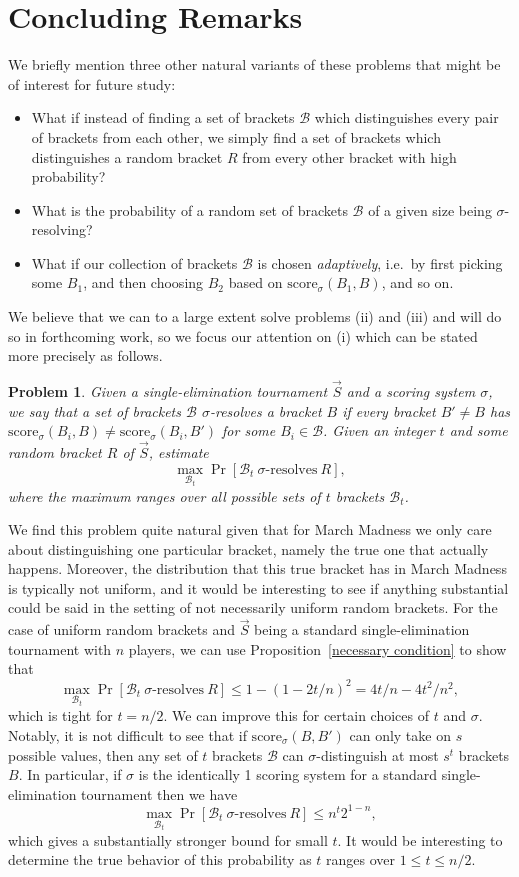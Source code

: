 \documentclass[12pt,letterpaper]{article}
\newtheorem{prob}[thm]{Problem}
\theoremstyle{definition}
\newcommand{\sig}{\sigma}
\renewcommand{\1}{\mathbbm{1}}
\renewcommand{\c}[1]{\mathcal{#1}}
\newcommand{\score}{\mathrm{score}}
\newcommand{\tour}{\vec{S}}
\begin{document}
\section{Concluding Remarks}\label{sec:concluding}

We briefly mention three other natural variants of these problems that might be of interest for future study:
\begin{itemize}
	\item[(i)] What if instead of finding a set of brackets $\c{B}$ which distinguishes every pair of brackets from each other, we simply find a set of brackets which distinguishes a random bracket $R$ from every other bracket with high probability?
	\item[(ii)] What is the probability of a random set of brackets $\c{B}$ of a given size being $\sig$-resolving?
	\item[(iii)] What if our collection of brackets $\c{B}$ is chosen \textit{adaptively}, i.e.\ by first picking some $B_1$, and then choosing $B_2$ based on $\score_\sig(B_1,B)$, and so on.
\end{itemize}

We believe that we can to a large extent solve problems (ii) and (iii) and will do so in forthcoming work, so we focus our attention on (i) which can be stated more precisely as follows.

\begin{prob}
	Given a single-elimination tournament $\tour$ and a scoring system $\sig$, we say that a set of brackets $\c{B}$ $\sig$-resolves a bracket $B$ if every bracket $B'\ne B$ has $\score_\sig(B_i,B)\ne \score_\sig(B_i,B')$ for some $B_i\in \c{B}$.  Given an integer $t$ and some random bracket $R$ of $\tour$, estimate
	\[\max_{\c{B}_t} \Pr[\c{B}_t\ \sig\textrm{-resolves}\ R],\]
	where the maximum ranges over all possible sets of $t$ brackets $\c{B}_t$.
\end{prob}
We find this problem quite natural given that for March Madness we only care about distinguishing one particular bracket, namely the true one that actually happens.  Moreover, the distribution that this true bracket has in March Madness is typically not uniform, and it would be interesting to see if anything substantial could be said in the setting of not necessarily uniform random brackets.  For the case of uniform random brackets and $\tour$ being a standard single-elimination tournament with $n$ players, we can use Proposition~\ref{necessary condition} to show that
\[\max_{\c{B}_t} \Pr[\c{B}_t\ \sig\textrm{-resolves}\ R]\le 1-(1-2t/n)^2=4t/n-4t^2/n^2,\]
which is tight for $t=n/2$.
We can improve this for certain choices of $t$ and $\sig$.  Notably, it is not difficult to see that if $\score_\sig(B,B')$ can only take on $s$ possible values, then any set of $t$ brackets $\c{B}$ can $\sig$-distinguish at most $s^t$ brackets $B$.  In particular, if $\sig$ is the identically 1 scoring system for a standard single-elimination tournament then we have
\[\max_{\c{B}_t} \Pr[\c{B}_t\ \sig\textrm{-resolves}\ R]\le n^t 2^{1-n},\]
which gives a substantially stronger bound for small $t$.  It would be interesting to determine the true behavior of this probability as $t$ ranges over $1\le t\le n/2$.
\end{document}
